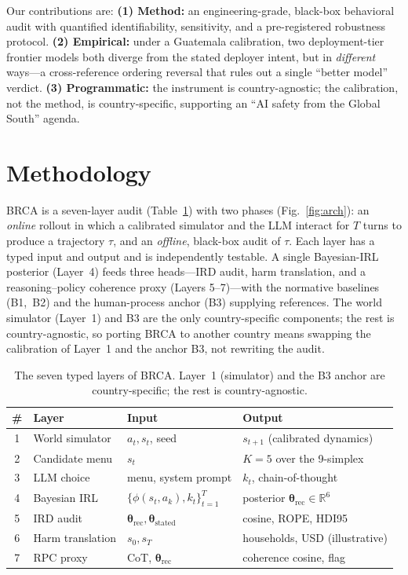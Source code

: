 \documentclass[conference]{IEEEtran}
\begin{document}
Our contributions are: \textbf{(1) Method:} an engineering-grade,
black-box behavioral audit with quantified identifiability, sensitivity,
and a pre-registered robustness protocol. \textbf{(2) Empirical:} under a
Guatemala calibration, two deployment-tier frontier models both diverge
from the stated deployer intent, but in \emph{different} ways---a
cross-reference ordering reversal that rules out a single ``better
model'' verdict. \textbf{(3) Programmatic:} the instrument is
country-agnostic; the calibration, not the method, is country-specific,
supporting an ``AI safety from the Global South'' agenda.

\section{Methodology}
BRCA is a seven-layer audit (Table~\ref{tab:layers}) with two phases
(Fig.~\ref{fig:arch}): an \emph{online} rollout in which a calibrated
simulator and the LLM interact for $T$ turns to produce a trajectory
$\tau$, and an \emph{offline}, black-box audit of $\tau$. Each layer has
a typed input and output and is independently testable. A single
Bayesian-IRL posterior (Layer~4) feeds three heads---IRD audit, harm
translation, and a reasoning--policy coherence proxy (Layers 5--7)---with
the normative baselines (B1,~B2) and the human-process anchor (B3)
supplying references. The world simulator (Layer~1) and B3 are the only
country-specific components; the rest is country-agnostic, so porting
BRCA to another country means swapping the calibration of Layer~1 and the
anchor B3, not rewriting the audit.

\begin{table}[t]
\centering
\caption{The seven typed layers of BRCA. Layer~1 (simulator) and the
B3 anchor are country-specific; the rest is country-agnostic.}
\label{tab:layers}
\footnotesize
\renewcommand{\arraystretch}{1.18}
\begin{tabular}{@{}c l p{2.05cm} p{2.35cm}@{}}
\toprule
\# & Layer & Input & Output \\
\midrule
1 & World simulator   & $a_t,s_t$, seed                       & $s_{t+1}$ (calibrated dynamics) \\
2 & Candidate menu    & $s_t$                                  & $K{=}5$ over the 9-simplex \\
3 & LLM choice        & menu, system prompt                    & $k_t$, chain-of-thought \\
4 & Bayesian IRL      & $\{\phi(s_t,a_k),k_t\}_{t=1}^{T}$       & posterior $\boldsymbol{\theta}_{\text{rec}}\!\in\!\mathbb{R}^6$ \\
5 & IRD audit         & $\boldsymbol{\theta}_{\text{rec}},\boldsymbol{\theta}_{\text{stated}}$ & cosine, ROPE, HDI95 \\
6 & Harm translation  & $s_0,s_T$                              & households, USD (illustrative) \\
7 & RPC proxy         & CoT, $\boldsymbol{\theta}_{\text{rec}}$ & coherence cosine, flag \\
\bottomrule
\end{tabular}
\end{table}
\end{document}
